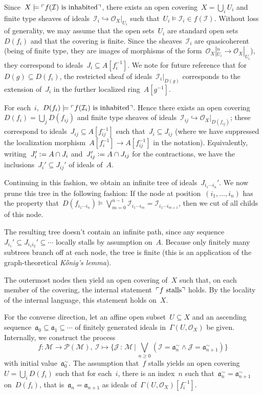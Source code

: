 \documentclass[10pt,reqno,a4paper]{amsbook}
\makeatletter
\theoremstyle{definition}
\theoremstyle{plain}
\theoremstyle{remark}
\let\acuteH\H
\newcommand{\konig}{K\acuteH onig}
\renewcommand{\H}{\mathcal{H}}
\renewcommand{\O}{\mathcal{O}}
\newcommand{\M}{\mathcal{M}}
\renewcommand{\P}{\mathcal{P}}
\newcommand{\I}{\mathcal{I}}
\newcommand{\J}{\mathcal{J}}
\newcommand{\aaa}{\mathfrak{a}}
\newcommand{\?}{\,{:}\,}
\renewcommand{\_}{\mathpunct{.}\,}
\newcommand{\speak}[1]{\ulcorner\text{\textnormal{#1}}\urcorner}
\newcommand{\lra}{\longrightarrow}
\newcommand{\defeq}{\vcentcolon=}
\renewenvironment{proof}[1][\proofname]{\par
  \pushQED{\qed}%
  \normalfont \topsep6\p@\@plus6\p@\relax
  \trivlist
  \item[\hskip\labelsep
        \itshape
    #1\@addpunct{.}]\ignorespaces
}{%
  \popQED\endtrivlist\@endpefalse
}
\makeatother
\begin{document}
{\begin{proof}
Since~$X \models \speak{$f(\I)$ is inhabited}$, there exists an open covering~$X
= \bigcup_i U_i$ and finite type sheaves of ideals~$\I_i \hookrightarrow
\O_X|_{U_i}$ such that~$U_i \models \I_i \in f(\I)$. Without loss of generality,
we may assume that the open sets~$U_i$ are standard open sets~$D(f_i)$ and that
the covering is finite. Since the sheaves~$\I_i$ are quasicoherent (being of
finite type, they are images of morphisms of the form~$\O_X|_{U_i}^n \to
\O_X|_{U_i}$), they correspond to ideals~$J_i \subseteq A[f_i^{-1}]$. We note for future reference
that for~$D(g) \subseteq D(f_i)$, the restricted sheaf of ideals~$\I_i|_{D(g)}$
corresponds to the extension of~$J_i$ in the further
localized ring~$A[g^{-1}]$.

For each~$i$,~$D(f_i) \models \speak{$f(\I_i)$ is inhabited}$.
Hence there exists an open covering~$D(f_i) = \bigcup_j D(f_{ij})$ and finite
type sheaves of ideals~$\I_{ij} \hookrightarrow \O_X|_{D(f_{ij})}$; these
correspond to ideals~$J_{ij} \subseteq A[f_{ij}^{-1}]$ such that~$J_i
\subseteq J_{ij}$ (where we have suppressed the localization
morphism~$A[f_i^{-1}] \to A[f_{ij}^{-1}]$ in the notation). Equivalently,
writing~$J_i' \defeq A \cap J_i$ and~$J_{ij}' \defeq A \cap J_{ij}$ for the
contractions, we have the inclusions~$J_i' \subseteq J_{ij}'$ of ideals of~$A$.

Continuing in this fashion, we obtain an infinite tree of ideals~$J_{i_1 \cdots i_n}'$.
We now prune this tree in the following fashion: If the node at position~$(i_1,
\ldots, i_n)$ has the property that~$D(f_{i_1 \cdots i_n}) \models
\bigvee_{m=0}^{n-1} \I_{i_1 \cdots i_m} = \I_{i_1 \cdots i_{m+1}}$, then we cut
of all childs of this node.

The resulting tree doesn't contain an infinite path, since any
sequence~$J_{i_1}' \subseteq J_{i_1 i_2}' \subseteq \cdots$ locally stalls by
assumption on~$A$. Because only finitely many subtrees branch off at each node,
the tree is finite (this is an application of the graph-theoretical
\emph{\konig's lemma}).

The outermost nodes then yield an open covering of~$X$ such that, on each
member of the covering, the internal statement~$\speak{$f$ stalls}$ holds. By
the locality of the internal language, this statement holds on~$X$.

For the converse direction, let an affine open subset~$U \subseteq X$ and an
ascending sequence~$\aaa_0 \subseteq \aaa_1 \subseteq \cdots$ of finitely
generated ideals in~$\Gamma(U, \O_X)$ be given. Internally, we construct the
process
\[ f : \M \lra \P(\M),\ \I \longmapsto \{ \J \? \M \,|\,
  \bigvee_{n \geq 0} (\I = \aaa_n^\sim \wedge \J = \aaa_{n+1}^\sim) \} \]
with initial value~$\aaa_0^\sim$. The assumption that~$f$ stalls yields an open
covering~$U = \bigcup_i D(f_i)$ such that for each~$i$, there is an index~$n$
such that~$\aaa_n^\sim = \aaa_{n+1}^\sim$ on~$D(f_i)$, that is~$\aaa_n =
\aaa_{n+1}$ as ideals of~$\Gamma(U, \O_X)[f_i^{-1}]$.
\end{proof}

}
\end{document}
